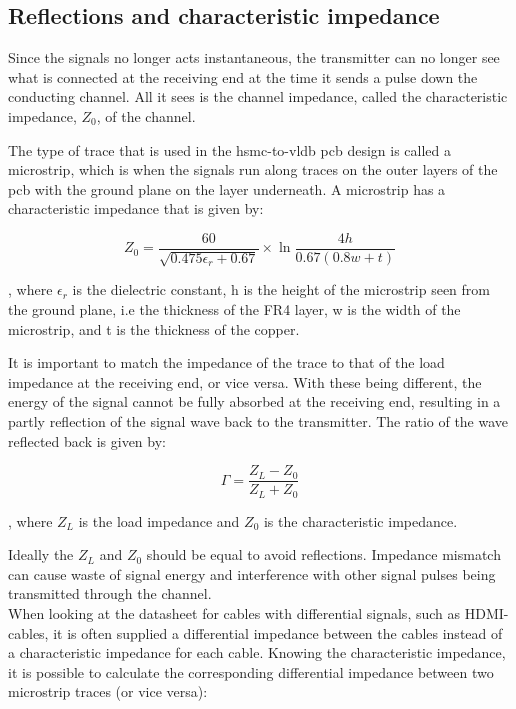 \documentclass[main.tex]{subfiles}
\begin{document}
\subsection{Reflections and characteristic impedance}

Since the signals no longer acts instantaneous, the transmitter can no longer see what is connected at the receiving end at the time it sends a pulse down the conducting channel. All it sees is the channel impedance, called the characteristic impedance, $Z_0$, of the channel. \cite{weste11}

The type of trace that is used in the \gls{hsmc}-to-\gls{vldb} \gls{pcb} design is called a microstrip, which is when the signals run along traces on the outer layers of the \gls{pcb} with the ground plane on the layer underneath. A microstrip has a characteristic impedance that is given by:

\begin{equation}
    Z_0 = \frac{60}{\sqrt{0.475\epsilon_r + 0.67}} \times \ln{\frac{4h}{0.67(0.8w + t)}}
\end{equation}

, where $\epsilon_r$ is the dielectric constant, h is the height of the microstrip seen from the ground plane, i.e the thickness of the FR4 layer, w is the width of the microstrip, and t is the thickness of the copper.
\cite{weste11}

It is important to match the impedance of the trace to that of the load impedance at the receiving end, or vice versa. With these being different, the energy of the signal cannot be fully absorbed at the receiving end, resulting in a partly reflection of the signal wave back to the transmitter. The ratio of the wave reflected back is given by:

\begin{equation}
\Gamma = \frac{Z_L - Z_0}{Z_L + Z_0}	
\end{equation}

, where $Z_L$ is the load impedance and $Z_0$ is the characteristic impedance.

Ideally the $Z_L$ and $Z_0$ should be equal to avoid reflections. Impedance mismatch can cause waste of signal energy and interference with other signal pulses being transmitted through the channel. \cite{weste11} \\

When looking at the datasheet for cables with differential signals, such as HDMI-cables, it is often supplied a differential impedance between the cables instead of a characteristic impedance for each cable. Knowing the characteristic impedance, it is possible to calculate the corresponding differential impedance between two microstrip traces (or vice versa):
\end{document}
